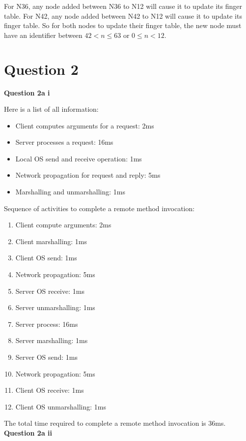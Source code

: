 \documentclass[11pt,a4paper]{report}
\begin{document}
\begin{multicols*}{2}
\noindent For N36, any node added between N36 to N12 will cause it to update its finger table. For N42, any node added between N42 to N12 will cause it to update its finger table. So for both nodes to update their finger table, the new node must have an identifier between $42<n\le 63$ or $0\le n <12$.

\section{Question 2}

\noindent \textbf{Question 2a i}

\noindent Here is a list of all information:
\begin{itemize}
  \item Client computes arguments for a request: 2ms
  \item Server processes a request: 16ms
  \item Local OS send and receive operation: 1ms
  \item Network propagation for request and reply: 5ms
  \item Marshalling and unmarshalling: 1ms
\end{itemize}

\noindent Sequence of activities to complete a remote method invocation:
\begin{enumerate}
  \item Client compute arguments: 2ms
  \item Client marshalling: 1ms
  \item Client OS send: 1ms
  \item Network propagation: 5ms
  \item Server OS receive: 1ms
  \item Server unmarshalling: 1ms
  \item Server process: 16ms
  \item Server marshalling: 1ms
  \item Server OS send: 1ms
  \item Network propagation: 5ms
  \item Client OS receive: 1ms
  \item Client OS unmarshalling: 1ms
\end{enumerate}

\noindent The total time required to complete a remote method invocation is 36ms.\\

\noindent \textbf{Question 2a ii}


\end{multicols*}
\end{document}
